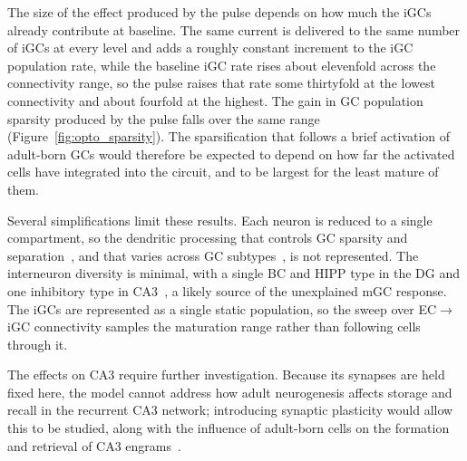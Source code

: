The size of the effect produced by the pulse depends on how much the iGCs already contribute at baseline. The same current is
delivered to the same number of iGCs at every level and adds a roughly constant increment to the iGC population rate, while the
baseline iGC rate rises about elevenfold across the connectivity range, so the pulse raises that rate some thirtyfold at the
lowest connectivity and about fourfold at the highest. The gain in GC population sparsity produced by the pulse falls over the
same range (Figure~\ref{fig:opto_sparsity}). The sparsification that follows a brief activation of adult-born GCs would therefore be
expected to depend on how far the activated cells have integrated into the circuit, and to be largest for the least mature of
them.

Several simplifications limit these results. Each neuron is reduced to a single compartment, so the dendritic processing that
controls GC sparsity and separation~\parencite{chavlisDendrites2017}, and that varies across GC
subtypes~\parencite{maoExcitatory2025}, is not represented. The interneuron diversity is minimal, with a single BC and HIPP type
in the DG and one inhibitory type in CA3~\parencite{kopsickFormation2024}, a likely source of the unexplained mGC response. The
iGCs are represented as a single static population, so the sweep over EC$\to$iGC connectivity samples the maturation range rather
than following cells through it.

The effects on CA3 require further investigation. Because its synapses are held fixed here, the model cannot address how adult
neurogenesis affects storage and recall in the recurrent CA3 network; introducing synaptic plasticity would allow this to be
studied, along with the influence of adult-born cells on the formation and retrieval of CA3 engrams~\parencite{rollsMechanisms2013,
kopsickFormation2024, koSystems2025}.
